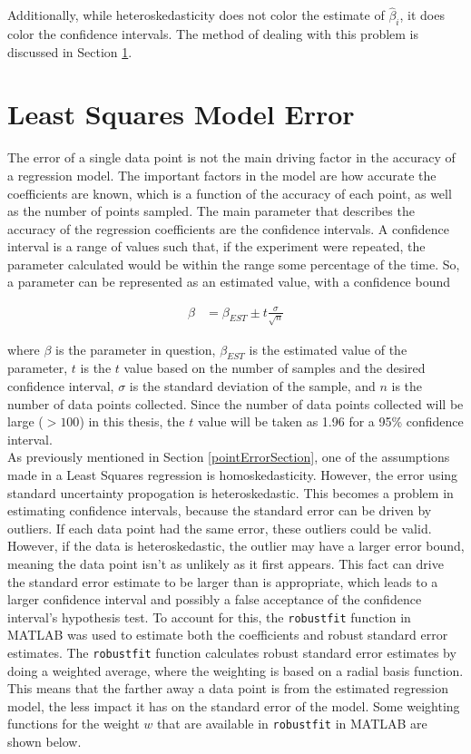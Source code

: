Additionally, while heteroskedasticity does not color the estimate of $\hat{\beta}_i$, it does color the confidence intervals. The method of dealing with this problem is discussed in Section \ref{leastSquaresError}.


\section{Least Squares Model Error}
\label{leastSquaresError}
The error of a single data point is not the main driving factor in the accuracy of a regression model. The important factors in the model are how accurate the coefficients are known, which is a function of the accuracy of each point, as well as the number of points sampled. The main parameter that describes the accuracy of the regression coefficients are the confidence intervals. A confidence interval is a range of values such that, if the experiment were repeated, the parameter calculated would be within the range some percentage of the time. So, a parameter can be represented as an estimated value, with a confidence bound

\begin{align}
\label{confidenceInterval}
\beta &= \beta_{EST} \pm t\frac{\sigma}{\sqrt{n}}
\end{align}

where $\beta$ is the parameter in question, $\beta_{EST}$ is the estimated value of the parameter, $t$ is the $t$ value based on the number of samples and the desired confidence interval, $\sigma$ is the standard deviation of the sample, and $n$ is the number of data points collected. Since  the number of data points collected will be large ($>100$) in this thesis, the $t$ value will be taken as 1.96 for a 95\% confidence interval.\\
As previously mentioned in Section \ref{pointErrorSection}, one of the assumptions made in a Least Squares regression is homoskedasticity. However, the error using standard uncertainty propogation is heteroskedastic. This becomes a problem in estimating confidence intervals, because the standard error can be driven by outliers. If each data point had the same error, these outliers could be valid. However, if the data is heteroskedastic, the outlier may have a larger error bound, meaning the data point isn't as unlikely as it first appears. This fact can drive the standard error estimate to be larger than is appropriate, which leads to a larger confidence interval and possibly a false acceptance of the confidence interval's hypothesis test. To account for this, the \texttt{robustfit} function in MATLAB  was used to estimate both the coefficients and robust standard error estimates. The \texttt{robustfit} function calculates robust standard error estimates by doing a weighted average, where the weighting is based on a radial basis function. This means that the farther away a data point is from the estimated regression model, the less impact it has on the standard error of the model. Some weighting functions for the weight $w$ that are available in \texttt{robustfit} in MATLAB are shown below.

